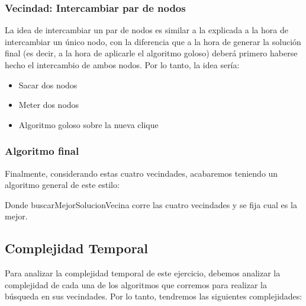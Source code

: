 \subsubsection{Vecindad: Intercambiar par de nodos}
La idea de intercambiar un par de nodos es similar a la explicada a la hora de intercambiar un único nodo, con la diferencia que a la hora de generar la solución final (es decir, a la hora de aplicarle el algoritmo goloso) deberá primero haberse hecho el intercambio de ambos nodos. Por lo tanto, la idea sería:
\begin{itemize}
	\item Sacar dos nodos
	\item Meter dos nodos
	\item Algoritmo goloso sobre la nueva clique
\end{itemize}

\subsubsection{Algoritmo final}
Finalmente, considerando estas cuatro vecindades, acabaremos teniendo un algoritmo general de este estilo:

\begin{algorithm}[H]
 \NoCaptionOfAlgo
 \caption{}


\end{algorithm}

Donde buscarMejorSolucionVecina corre las cuatro vecindades y se fija cual es la mejor.

\subsection{Complejidad Temporal}
Para analizar la complejidad temporal de este ejercicio, debemos analizar la complejidad de cada una de los algoritmos que corremos para realizar la búsqueda en sus vecindades. Por lo tanto, tendremos las siguientes complejidades:

